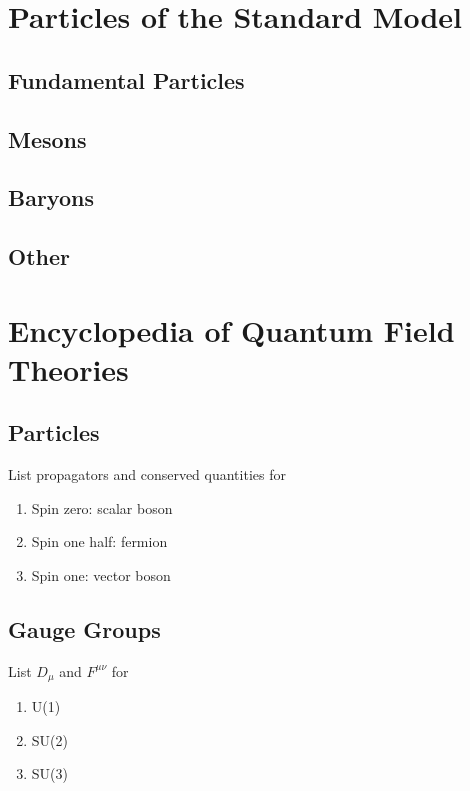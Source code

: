 \chapter{Particles of the Standard Model}
\section{Fundamental Particles}


\section{Mesons}


\section{Baryons}


\section{Other}



\chapter{Encyclopedia of Quantum Field Theories}
\section{Particles}

List propagators and conserved quantities for 

\begin{enumerate}
  \item Spin zero: scalar boson
  \item Spin one half: fermion
  \item Spin one: vector boson
\end{enumerate}


\section{Gauge Groups}

List $D_\mu$ and $F^{\mu \nu}$ for 

\begin{enumerate}
  \item U(1)
  \item SU(2)
  \item SU(3)
\end{enumerate}



